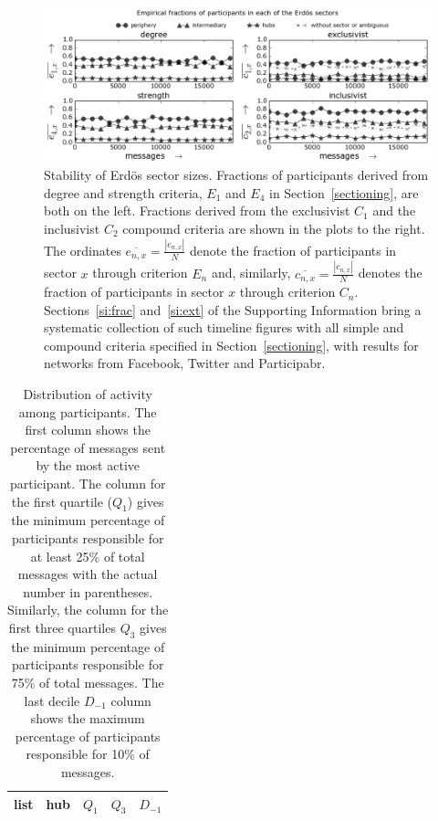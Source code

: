 \documentclass[%
aip,
jmp,%
amsmath,amssymb,
reprint,%
]{revtex4-1}
\begin{document}
\begin{figure} 
\centering
\includegraphics[width=\textwidth]{figs/InText-WLAU-S1000_}
\caption{Stability of Erd\"os sector sizes.
Fractions of participants derived from degree and strength criteria, $E_1$ and $E_4$ in Section~\ref{sectioning}, are both on the left.
Fractions derived from the exclusivist $C_1$ and the inclusivist $C_2$ compound criteria are shown in the plots to the right.
The ordinates $\overline{e_{n,x}}=\frac{|e_{n,x}|}{N}$ denote the fraction of participants in sector $x$ through criterion $E_n$
and, similarly, $\overline{c_{n,x}}=\frac{|c_{n,x}|}{N}$ denotes the fraction of participants in sector $x$ through criterion $C_n$.
Sections~\ref{si:frac} and~\ref{si:ext} of the Supporting Information bring a systematic collection of such timeline figures with all simple and compound criteria specified in Section~\ref{sectioning}, with results for networks from Facebook, Twitter and Participabr.}
\label{fig:sectIL}
\end{figure}


\begin{table}[h]
\caption{Distribution of activity among participants.
The first column shows the percentage of messages sent by the most active participant. The column for the first quartile ($Q_1$) gives the minimum percentage of participants responsible for at least 25\% of total messages with the actual number in parentheses. Similarly, the column for the first three quartiles $Q_3$ gives the minimum percentage of participants responsible for 75\% of total messages.
The last decile $D_{-1}$ column shows the maximum percentage of participants responsible for 10\% of messages.}
\begin{center}
\begin{tabular}{ | l ||  c | c | c | c | }
\hline
list & hub & $ Q_1 $ & $ Q_3 $ & $D_{-1}$ \\ \hline

\end{tabular}
\end{center}
\label{autores}
\end{table}
\end{document}
